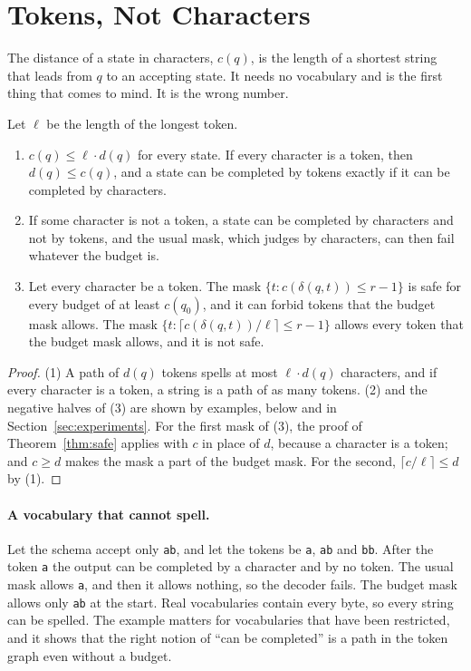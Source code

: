 \documentclass[acmsmall,nonacm,screen]{acmart}
\newcommand{\str}[1]{\texttt{#1}}
\newcommand{\far}{d}
\newcommand{\claim}[2]{#2}
\begin{document}
\section{Tokens, Not Characters}\label{sec:characters}

The distance of a state in characters, $c(q)$, is the length of a shortest string that leads
from $q$ to an accepting state. It needs no vocabulary and is the first thing that comes to
mind. It is the wrong number.

\begin{proposition}[Characters]\label{prop:characters}
Let $\ell$ be the length of the longest token.
\begin{enumerate}
\item $c(q) \le \ell \cdot \far(q)$ for every state. If every character is a token, then
  $\far(q) \le c(q)$, and a state can be completed by tokens exactly if it can be completed
  by characters.
\item If some character is not a token, a state can be completed by characters and not by
  tokens, and the usual mask, which judges by characters, can then fail whatever the budget
  is.
\item Let every character be a token. The mask $\{t : c(\delta(q, t)) \le r - 1\}$ is safe
  for every budget of at least $c(q_0)$, and it can forbid tokens that the budget mask
  allows. The mask $\{t : \lceil c(\delta(q, t)) / \ell \rceil \le r - 1\}$ allows every
  token that the budget mask allows, and it is not safe.
\end{enumerate}
\end{proposition}

\begin{proof}
(1) A path of $\far(q)$ tokens spells at most $\ell \cdot \far(q)$ characters, and if every
character is a token, a string is a path of as many tokens. (2) and the negative halves of
(3) are shown by examples, below and in Section~\ref{sec:experiments}. For the first mask of
(3), the proof of Theorem~\ref{thm:safe} applies with $c$ in place of $\far$, because a
character is a token; and $c \ge \far$ makes the mask a part of the budget mask. For the
second, $\lceil c / \ell \rceil \le \far$ by (1).
\end{proof}

\paragraph{A vocabulary that cannot spell.} \claim{stuck}{Let the schema accept only
\str{ab}, and let the tokens be \str{a}, \str{ab} and \str{bb}. After the token \str{a} the
output can be completed by a character and by no token. The usual mask allows \str{a}, and
then it allows nothing, so the decoder fails. The budget mask allows only \str{ab} at the
start.} Real vocabularies contain every byte, so every string can be spelled. The example
matters for vocabularies that have been restricted, and it shows that the right notion of
``can be completed'' is a path in the token graph even without a budget.
\end{document}
